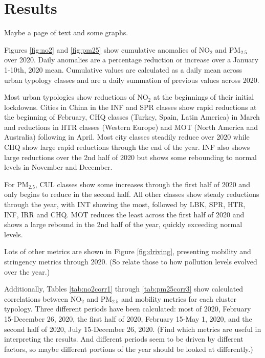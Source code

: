 \documentclass[preprint,12pt]{elsarticle}
\begin{document}
\section*{Results}
Maybe a page of text and some graphs.

Figures \ref{fig:no2} and \ref{fig:pm25} show cumulative anomalies of NO$_{2}$ and PM$_{2.5}$ over 2020. Daily anomalies are a percentage reduction or increase over a January 1-10th, 2020 mean. Cumulative values are calculated as a daily mean across urban typology classes and are a daily summation of previous values across 2020.

Most urban typologies show reductions of NO$_{2}$ at the beginnings of their initial lockdowns. Cities in China in the INF and SPR classes show rapid reductions at the beginning of February, CHQ classes (Turkey, Spain, Latin America) in March and reductions in HTR classes (Western Europe) and MOT (North America and Australia) following in April. Most city classes steadily reduce over 2020 while CHQ show large rapid reductions through the end of the year. INF also shows large reductions over the 2nd half of 2020 but shows some rebounding to normal levels in November and December.

For PM$_{2.5}$, CUL classes show some increases through the first half of 2020 and only begins to reduce in the second half. All other classes show steady reductions through the year, with INT showing the most, followed by LBK, SPR, HTR, INF, IRR and CHQ. MOT reduces the least across the first half of 2020 and shows a large rebound in the 2nd half of the year, quickly exceeding normal levels.

Lots of other metrics are shown in Figure \ref{fig:driving}, presenting mobility and stringency metrics through 2020. (So relate those to how pollution levels evolved over the year.)

Additionally, Tables \ref{tab:no2corr1} through \ref{tab:pm25corr3} show calculated correlations between NO$_{2}$ and PM$_{2.5}$ and mobility metrics for each cluster typology. Three different periods have been calculated: most of 2020, February 15-December 26, 2020, the first half of 2020, February 15-May 1, 2020, and the second half of 2020, July 15-December 26, 2020. (Find which metrics are useful in interpreting the results. And different periods seem to be driven by different factors, so maybe different portions of the year should be looked at differently.)
\end{document}
